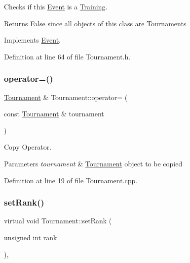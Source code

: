 Checks if this \hyperlink{class_event}{Event} is a \hyperlink{class_training}{Training}. 

\begin{DoxyReturn}{Returns}
False since all objects of this class are Tournaments 
\end{DoxyReturn}


Implements \hyperlink{class_event_a08af9b350f32520dca26d552d6f415b2}{Event}.



Definition at line 64 of file Tournament.\+h.

\hypertarget{class_tournament_a0eadb353ccff0b3c64b19d65f3353771}{}\label{class_tournament_a0eadb353ccff0b3c64b19d65f3353771} 
\subsubsection{\texorpdfstring{operator=()}{operator=()}}
{\footnotesize\ttfamily \hyperlink{class_tournament}{Tournament} \& Tournament\+::operator= (\begin{DoxyParamCaption}\item[{const \hyperlink{class_tournament}{Tournament} \&}]{tournament }\end{DoxyParamCaption})}



Copy Operator. 


\begin{DoxyParams}{Parameters}
{\em tournament} & \hyperlink{class_tournament}{Tournament} object to be copied \\
\hline
\end{DoxyParams}


Definition at line 19 of file Tournament.\+cpp.

\hypertarget{class_tournament_a724f8fb0c0507975b6bb4817d8b5de7d}{}\label{class_tournament_a724f8fb0c0507975b6bb4817d8b5de7d} 
\subsubsection{\texorpdfstring{set\+Rank()}{setRank()}}
{\footnotesize\ttfamily virtual void Tournament\+::set\+Rank (\begin{DoxyParamCaption}\item[{unsigned int}]{rank }\end{DoxyParamCaption})\hspace{0.3cm}{\ttfamily [inline]}, {\ttfamily [virtual]}}



